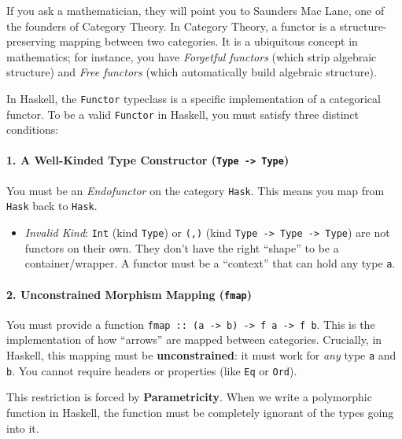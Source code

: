 \documentclass[
]{article}
\providecommand{\tightlist}{%
  \setlength{\itemsep}{0pt}\setlength{\parskip}{0pt}}
\begin{document}
If you ask a mathematician, they will point you to Saunders Mac Lane,
one of the founders of Category Theory. In Category Theory, a functor is
a structure-preserving mapping between two categories. It is a
ubiquitous concept in mathematics; for instance, you have
\emph{Forgetful functors} (which strip algebraic structure) and
\emph{Free functors} (which automatically build algebraic structure).

In Haskell, the \texttt{Functor} typeclass is a specific implementation
of a categorical functor. To be a valid \texttt{Functor} in Haskell, you
must satisfy three distinct conditions:

\paragraph{\texorpdfstring{1. A Well-Kinded Type Constructor
(\texttt{Type\ -\textgreater{}\ Type})}{1. A Well-Kinded Type Constructor (Type -\textgreater{} Type)}}\label{a-well-kinded-type-constructor-type---type}

You must be an \emph{Endofunctor} on the category \texttt{Hask}. This
means you map from \texttt{Hask} back to \texttt{Hask}.

\begin{itemize}
\tightlist
\item
  \emph{Invalid Kind}: \texttt{Int} (kind \texttt{Type}) or \texttt{(,)}
  (kind \texttt{Type\ -\textgreater{}\ Type\ -\textgreater{}\ Type}) are
  not functors on their own. They don't have the right ``shape'' to be a
  container/wrapper. A functor must be a ``context'' that can hold any
  type \texttt{a}.
\end{itemize}

\paragraph{\texorpdfstring{2. Unconstrained Morphism Mapping
(\texttt{fmap})}{2. Unconstrained Morphism Mapping (fmap)}}\label{unconstrained-morphism-mapping-fmap}

You must provide a function
\texttt{fmap\ ::\ (a\ -\textgreater{}\ b)\ -\textgreater{}\ f\ a\ -\textgreater{}\ f\ b}.
This is the implementation of how ``arrows'' are mapped between
categories. Crucially, in Haskell, this mapping must be
\textbf{unconstrained}: it must work for \emph{any} type \texttt{a} and
\texttt{b}. You cannot require headers or properties (like \texttt{Eq}
or \texttt{Ord}).

This restriction is forced by \textbf{Parametricity}. When we write a
polymorphic function in Haskell, the function must be completely
ignorant of the types going into it.
\end{document}
